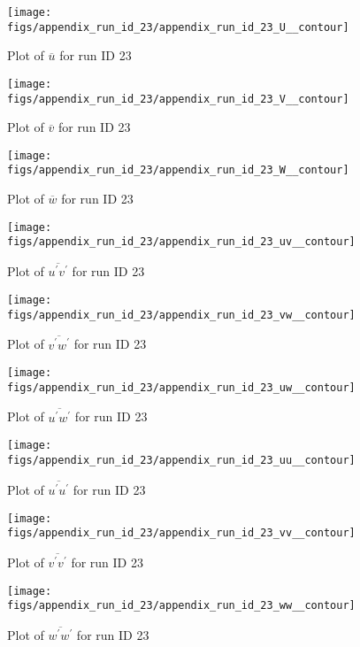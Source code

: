 \begin{figure}[H]
\centering
\texttt{[image: figs/appendix\_run\_id\_23/appendix\_run\_id\_23\_U\_\_contour]}
\caption{Plot of $\overline{u}$ for run ID 23}
\label{fig:appendix_run_id_23_U__contour}
\end{figure}


\begin{figure}[H]
\centering
\texttt{[image: figs/appendix\_run\_id\_23/appendix\_run\_id\_23\_V\_\_contour]}
\caption{Plot of $\overline{v}$ for run ID 23}
\label{fig:appendix_run_id_23_V__contour}
\end{figure}


\begin{figure}[H]
\centering
\texttt{[image: figs/appendix\_run\_id\_23/appendix\_run\_id\_23\_W\_\_contour]}
\caption{Plot of $\overline{w}$ for run ID 23}
\label{fig:appendix_run_id_23_W__contour}
\end{figure}


\begin{figure}[H]
\centering
\texttt{[image: figs/appendix\_run\_id\_23/appendix\_run\_id\_23\_uv\_\_contour]}
\caption{Plot of $\overline{u^\prime v^\prime}$ for run ID 23}
\label{fig:appendix_run_id_23_uv__contour}
\end{figure}


\begin{figure}[H]
\centering
\texttt{[image: figs/appendix\_run\_id\_23/appendix\_run\_id\_23\_vw\_\_contour]}
\caption{Plot of $\overline{v^\prime w^\prime}$ for run ID 23}
\label{fig:appendix_run_id_23_vw__contour}
\end{figure}


\begin{figure}[H]
\centering
\texttt{[image: figs/appendix\_run\_id\_23/appendix\_run\_id\_23\_uw\_\_contour]}
\caption{Plot of $\overline{u^\prime w^\prime}$ for run ID 23}
\label{fig:appendix_run_id_23_uw__contour}
\end{figure}


\begin{figure}[H]
\centering
\texttt{[image: figs/appendix\_run\_id\_23/appendix\_run\_id\_23\_uu\_\_contour]}
\caption{Plot of $\overline{u^\prime u^\prime}$ for run ID 23}
\label{fig:appendix_run_id_23_uu__contour}
\end{figure}


\begin{figure}[H]
\centering
\texttt{[image: figs/appendix\_run\_id\_23/appendix\_run\_id\_23\_vv\_\_contour]}
\caption{Plot of $\overline{v^\prime v^\prime}$ for run ID 23}
\label{fig:appendix_run_id_23_vv__contour}
\end{figure}


\begin{figure}[H]
\centering
\texttt{[image: figs/appendix\_run\_id\_23/appendix\_run\_id\_23\_ww\_\_contour]}
\caption{Plot of $\overline{w^\prime w^\prime}$ for run ID 23}
\label{fig:appendix_run_id_23_ww__contour}
\end{figure}


